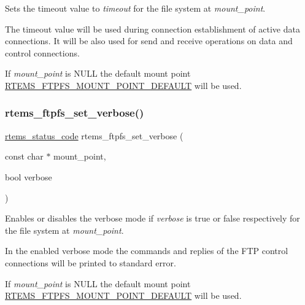 Sets the timeout value to {\itshape timeout} for the file system at {\itshape mount\+\_\+point}. 

The timeout value will be used during connection establishment of active data connections. It will be also used for send and receive operations on data and control connections.

If {\itshape mount\+\_\+point} is {\ttfamily N\+U\+LL} the default mount point \mbox{\hyperlink{group__rtems__ftpfs_ga62b0e39dcbe47ed7a94eb4d44848dda6}{R\+T\+E\+M\+S\+\_\+\+F\+T\+P\+F\+S\+\_\+\+M\+O\+U\+N\+T\+\_\+\+P\+O\+I\+N\+T\+\_\+\+D\+E\+F\+A\+U\+LT}} will be used. \mbox{\label{group__rtems__ftpfs_ga1b9eb4fa9eb72fe2218ee7448a7e970a}} 
\subsubsection{\texorpdfstring{rtems\_ftpfs\_set\_verbose()}{rtems\_ftpfs\_set\_verbose()}}
{\footnotesize\ttfamily \mbox{\hyperlink{group__ClassicStatus_ga545d41846817eaba6143d52ee4d9e9fe}{rtems\+\_\+status\+\_\+code}} rtems\+\_\+ftpfs\+\_\+set\+\_\+verbose (\begin{DoxyParamCaption}\item[{const char $\ast$}]{mount\+\_\+point,  }\item[{bool}]{verbose }\end{DoxyParamCaption})}



Enables or disables the verbose mode if {\itshape verbose} is {\ttfamily true} or {\ttfamily false} respectively for the file system at {\itshape mount\+\_\+point}. 

In the enabled verbose mode the commands and replies of the F\+TP control connections will be printed to standard error.

If {\itshape mount\+\_\+point} is {\ttfamily N\+U\+LL} the default mount point \mbox{\hyperlink{group__rtems__ftpfs_ga62b0e39dcbe47ed7a94eb4d44848dda6}{R\+T\+E\+M\+S\+\_\+\+F\+T\+P\+F\+S\+\_\+\+M\+O\+U\+N\+T\+\_\+\+P\+O\+I\+N\+T\+\_\+\+D\+E\+F\+A\+U\+LT}} will be used. 
